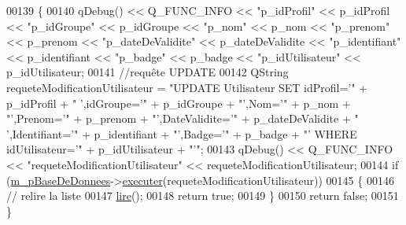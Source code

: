\begin{DoxyCode}
00139 \{
00140     qDebug() << Q\_FUNC\_INFO << \textcolor{stringliteral}{"p\_idProfil"} << p\_idProfil << \textcolor{stringliteral}{"p\_idGroupe"} << p\_idGroupe << \textcolor{stringliteral}{"p\_nom"} << p\_nom
       << \textcolor{stringliteral}{"p\_prenom"} << p\_prenom << \textcolor{stringliteral}{"p\_dateDeValidite"} << p\_dateDeValidite << \textcolor{stringliteral}{"p\_identifiant"} << p\_identifiant << \textcolor{stringliteral}{
      "p\_badge"} << p\_badge << \textcolor{stringliteral}{"p\_idUtilisateur"} << p\_idUtilisateur;
00141     \textcolor{comment}{//requête UPDATE}
00142     QString requeteModificationUtilisateur = \textcolor{stringliteral}{"UPDATE Utilisateur SET idProfil='"} + p\_idProfil + \textcolor{stringliteral}{"
      ',idGroupe='"} + p\_idGroupe + \textcolor{stringliteral}{"',Nom='"} + p\_nom + \textcolor{stringliteral}{"',Prenom='"} + p\_prenom + \textcolor{stringliteral}{"',DateValidite='"} + p\_dateDeValidite + \textcolor{stringliteral}{"
      ',Identifiant='"} + p\_identifiant + \textcolor{stringliteral}{"',Badge='"} + p\_badge + \textcolor{stringliteral}{"' WHERE idUtilisateur='"} + p\_idUtilisateur + \textcolor{stringliteral}{"'"};
00143     qDebug() << Q\_FUNC\_INFO << \textcolor{stringliteral}{"requeteModificationUtilisateur"} << requeteModificationUtilisateur;
00144     \textcolor{keywordflow}{if} (\hyperlink{class_utilisateurs_armoire_ac43b4894f5036117d044ad2d22b09318}{m\_pBaseDeDonnees}->\hyperlink{class_base_de_donnees_aa8de5f8f8bb17edc43f5c0ee33712081}{executer}(requeteModificationUtilisateur))
00145     \{
00146         \textcolor{comment}{// relire la liste}
00147         \hyperlink{class_utilisateurs_armoire_a10b2038874606c0afccf0f18c038dd0c}{lire}();
00148         \textcolor{keywordflow}{return} \textcolor{keyword}{true};
00149     \}
00150     \textcolor{keywordflow}{return} \textcolor{keyword}{false};
00151 \}
\end{DoxyCode}
\mbox{\label{class_utilisateurs_armoire_a035d7ca496ddaaf83467934fbd694883}} 
